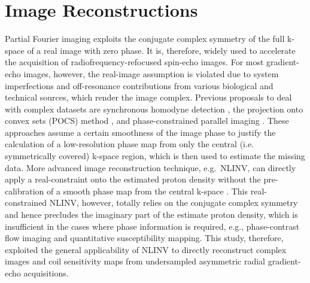 \section{Image Reconstructions}
Partial Fourier imaging exploits the conjugate complex symmetry of the full k-space of a real image with zero phase. It is, therefore, widely used to accelerate the acquisition of radiofrequency-refocused spin-echo images. For most gradient-echo images, however, the real-image assumption is violated due to system imperfections and off-resonance contributions from various biological and technical sources, which render the image complex. Previous proposals to deal with complex datasets are synchronous homodyne detection \cite{1991_homodyne}, the projection onto convex sets (\acs{POCS}) method \cite{1991_POCS}, and phase-constrained parallel imaging \cite{2005_PFPPI,2005_phaConstrain_PI}. These approaches assume a certain smoothness of the image phase to justify the calculation of a low-resolution phase map from only the central (i.e. symmetrically covered) k-space region, which is then used to estimate the missing data. More advanced image reconstruction technique, e.g.~NLINV, can directly apply a real-constraint onto the estimated proton density without the pre-calibration of a smooth phase map from the central k-space \cite{2009_Uecker_Thesis}. This real-constrained NLINV, however, totally relies on the conjugate complex symmetry and hence precludes the imaginary part of the estimate proton density, which is insufficient in the cases where phase information is required, e.g., phase-contrast flow imaging and quantitative susceptibility mapping. This study, therefore, exploited the general applicability of NLINV to directly reconstruct complex images and coil sensitivity maps from undersampled asymmetric radial gradient-echo acquisitions.

